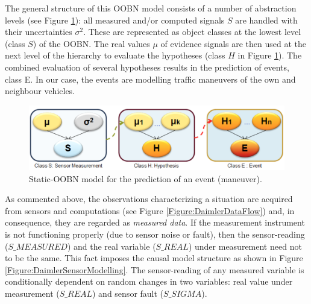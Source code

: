 

The general structure of this OOBN model consists of a number of abstraction levels (see Figure \ref{Figure:DaimlerOOBNAbstraction}): all measured and/or computed signals $S$ are handled with their uncertainties $\sigma^2$. These are represented as object classes at the lowest level (class $S$) of the OOBN. The real values $\mu$ of evidence signals are then used at the next level of the hierarchy to evaluate the hypotheses (class $H$ in Figure \ref{Figure:DaimlerOOBNAbstraction}). The combined evaluation of several hypotheses results in the prediction of events, class E. In our case, the events are modelling traffic maneuvers of the own and neighbour vehicles.

\begin{figure}
\begin{center}
\includegraphics[scale=0.35]{./figures/DaimlerOOBNAbstraction}
\caption{\label{Figure:DaimlerOOBNAbstraction} Static-OOBN model for the prediction of an event (maneuver).}
\end{center}
\end{figure}

As commented above, the observations characterizing a situation are acquired from sensors and computations (see Figure \ref{Figure:DaimlerDataFlow}) and, in consequence, they are regarded as  \textit{measured data}. If the measurement instrument is not functioning properly (due to sensor noise or fault), then the sensor-reading ($S\_MEASURED$) and the real variable ($S\_REAL$) under measurement need not to be the same. This fact imposes the causal model structure as shown in Figure \ref{Figure:DaimlerSensorModelling}. The sensor-reading of any measured variable is conditionally dependent on random changes in two variables: real value under measurement ($S\_REAL$) and sensor fault ($S\_SIGMA$).


